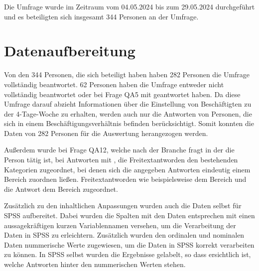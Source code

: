 Die Umfrage wurde im Zeitraum vom 04.05.2024 bis zum 29.05.2024 durchgeführt und es beteiligten sich
insgesamt 344 Personen an der Umfrage.

\section{Datenaufbereitung}
Von den 344 Personen, die sich beteiligt haben haben 282 Personen die Umfrage vollständig beantwortet.
62 Personen haben die Umfrage entweder nicht vollständig beantwortet oder bei Frage QA5  
mit  geantwortet haben. Da diese Umfrage darauf abzieht Informationen über die 
Einstellung von Beschäftigten zu der 4-Tage-Woche zu erhalten, werden auch nur die 
Antworten von Personen, die sich in einem Beschäftigungsverhältnis befinden berücksichtigt. 
Somit konnten die Daten von 282 Personen für die Auswertung herangezogen werden.

Außerdem wurde bei Frage QA12, welche nach der Branche fragt in der die Person tätig ist,
bei Antworten mit , die Freitextantworden den bestehenden Kategorien zugeordnet,
bei denen sich die angegeben Antworten eindeutig einem Bereich zuordnen ließen. 
Freitextantworden wie beispielsweise  dem Bereich  
und die Antwort  dem Bereich  zugeordnet.

Zusätzlich zu den inhaltlichen Anpassungen wurden auch die Daten selbst für \ac{SPSS} 
\parencite[vgl.][]{ibm_spss_nodate} aufbereitet.
Dabei wurden die Spalten mit den Daten entsprechen mit einen aussagekräftigen kurzen Variablennamen versehen,
um die Verarbeitung der Daten in \ac{SPSS} zu erleichtern. Zusätzlich wurden den ordinalen und nominalen Daten
nummerische Werte zugewiesen, um die Daten in \ac{SPSS} korrekt verarbeiten zu können.
In \ac{SPSS} selbst wurden die Ergebnisse gelabelt, so dass ersichtlich ist, welche Antworten hinter den 
nummerischen Werten stehen.

